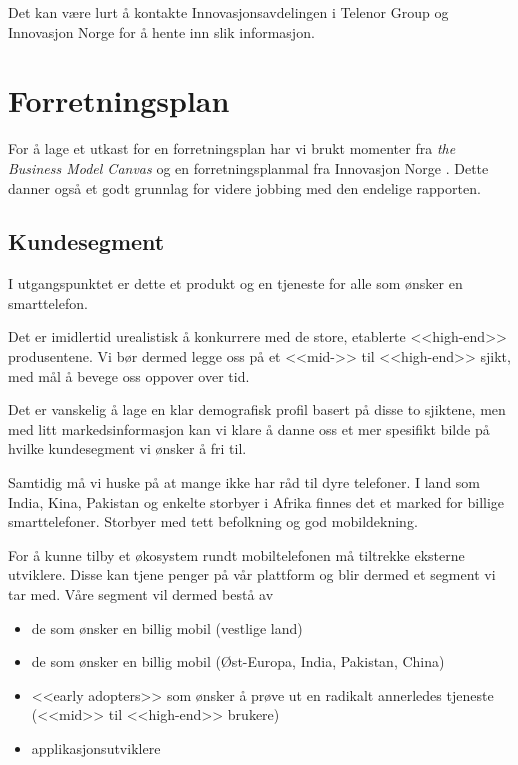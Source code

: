 Det kan være lurt å kontakte Innovasjonsavdelingen i Telenor Group og
Innovasjon Norge for å hente inn slik informasjon.

\section{Forretningsplan}

For å lage et utkast for en forretningsplan har vi brukt momenter fra
\textit{the Business Model Canvas} \cite{osterwalder} og en forretningsplanmal
fra Innovasjon Norge \cite{innovasjon.norge}. Dette danner også et godt
grunnlag for videre jobbing med den endelige rapporten.

\subsection{Kundesegment}

I utgangspunktet er dette et produkt og en tjeneste for alle som ønsker en
smarttelefon.

Det er imidlertid urealistisk å konkurrere med de store, etablerte <<high-end>>
produsentene.  Vi bør dermed legge oss på et <<mid->> til <<high-end>> sjikt,
med mål å bevege oss oppover over tid.

Det er vanskelig å lage en klar demografisk profil basert på disse to
sjiktene, men med litt markedsinformasjon kan vi klare å danne oss et mer
spesifikt bilde på hvilke kundesegment vi ønsker å fri til.

Samtidig må vi huske på at mange ikke har råd til dyre telefoner. I land som
India, Kina, Pakistan og enkelte storbyer i Afrika finnes det et marked for
billige smarttelefoner. Storbyer med tett befolkning og god mobildekning.

For å kunne tilby et økosystem rundt mobiltelefonen må tiltrekke eksterne
utviklere. Disse kan tjene penger på vår plattform og blir dermed et segment vi
tar med.  Våre segment vil dermed bestå av

\begin{itemize}
  \item de som ønsker en billig mobil (vestlige land)
  \item de som ønsker en billig mobil (Øst-Europa, India, Pakistan, China)
  \item <<early adopters>> som ønsker å prøve ut en radikalt annerledes
    tjeneste (<<mid>> til <<high-end>> brukere)
  \item applikasjonsutviklere
\end{itemize}

